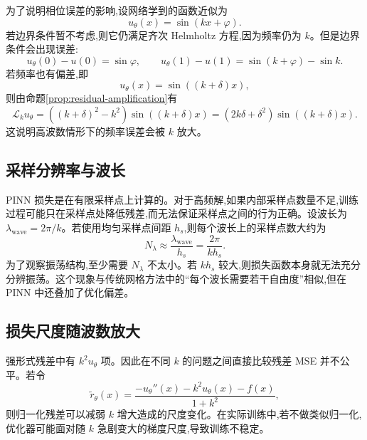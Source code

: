 \documentclass[12pt,hyperref,a4paper,UTF8,twoside]{ctexart}
\newcommand{\calL}{\mathcal L}
\begin{document}
为了说明相位误差的影响,设网络学到的函数近似为
\begin{equation}\label{eq:wrong-phase}
    u_\theta(x)=\sin(kx+\varphi).
\end{equation}
若边界条件暂不考虑,则它仍满足齐次 Helmholtz 方程,因为频率仍为 $k$。但是边界条件会出现误差:
\begin{equation}\label{eq:phase-boundary-error}
    u_\theta(0)-u(0)=\sin\varphi,
    \qquad
    u_\theta(1)-u(1)=\sin(k+\varphi)-\sin k.
\end{equation}
若频率也有偏差,即
\begin{equation}\label{eq:wrong-frequency}
    u_\theta(x)=\sin((k+\delta)x),
\end{equation}
则由命题\ref{prop:residual-amplification}有
\begin{equation}\label{eq:wrong-frequency-residual}
    \calL_k u_\theta=((k+\delta)^2-k^2)\sin((k+\delta)x)
    =(2k\delta+\delta^2)\sin((k+\delta)x).
\end{equation}
这说明高波数情形下的频率误差会被 $k$ 放大。

\subsection{采样分辨率与波长}

PINN 损失是在有限采样点上计算的。对于高频解,如果内部采样点数量不足,训练过程可能只在采样点处降低残差,而无法保证采样点之间的行为正确。设波长为 $\lambda_{\mathrm{wave}}=2\pi/k$。若使用均匀采样点间距 $h_s$,则每个波长上的采样点数大约为
\begin{equation}\label{eq:points-per-wavelength}
    N_{\lambda}\approx \frac{\lambda_{\mathrm{wave}}}{h_s}=\frac{2\pi}{kh_s}.
\end{equation}
为了观察振荡结构,至少需要 $N_\lambda$ 不太小。若 $kh_s$ 较大,则损失函数本身就无法充分分辨振荡。这个现象与传统网格方法中的“每个波长需要若干自由度”相似,但在 PINN 中还叠加了优化偏差。

\subsection{损失尺度随波数放大}

强形式残差中有 $k^2u_\theta$ 项。因此在不同 $k$ 的问题之间直接比较残差 MSE 并不公平。若令
\begin{equation}\label{eq:normalized-residual}
    \widetilde r_\theta(x)=\frac{-u_\theta''(x)-k^2u_\theta(x)-f(x)}{1+k^2},
\end{equation}
则归一化残差可以减弱 $k$ 增大造成的尺度变化。在实际训练中,若不做类似归一化,优化器可能面对随 $k$ 急剧变大的梯度尺度,导致训练不稳定。
\end{document}
